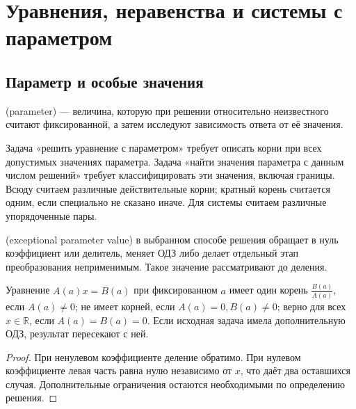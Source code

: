 \chapter{Уравнения, неравенства и системы с параметром}\label{chap:exam-parameters}
\section{Параметр и особые значения}
\begin{definition} (parameter) — величина, которую при решении относительно неизвестного считают фиксированной, а затем исследуют зависимость ответа от её значения.\end{definition}
Задача «решить уравнение с параметром» требует описать корни при всех допустимых значениях параметра. Задача «найти значения параметра с данным числом решений» требует классифицировать эти значения, включая границы. Всюду считаем различные действительные корни; кратный корень считается одним, если специально не сказано иначе. Для системы считаем различные упорядоченные пары.
\begin{definition} (exceptional parameter value) в выбранном способе решения обращает в нуль коэффициент или делитель, меняет ОДЗ либо делает отдельный этап преобразования неприменимым. Такое значение рассматривают до деления.\end{definition}
\begin{theorem}
Уравнение \(A(a)x=B(a)\) при фиксированном \(a\) имеет один корень \(\frac{B(a)}{A(a)}\), если \(A(a)\ne0\); не имеет корней, если \(A(a)=0,B(a)\ne0\); верно для всех \(x\in\mathbb R\), если \(A(a)=B(a)=0\). Если исходная задача имела дополнительную ОДЗ, результат пересекают с ней.
\end{theorem}
\begin{proof}При ненулевом коэффициенте деление обратимо. При нулевом коэффициенте левая часть равна нулю независимо от \(x\), что даёт два оставшихся случая. Дополнительные ограничения остаются необходимыми по определению решения.\end{proof}
